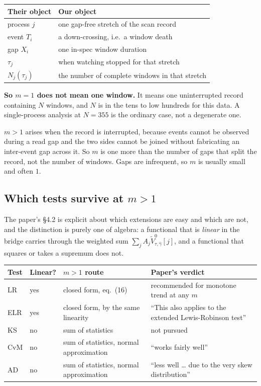 \documentclass[11pt,a4paper]{article}
\newcommand{\Vtilde}{\widetilde{V}^{0}_{\tau,\hat\gamma}}
\begin{document}
\begin{center}
\begin{tabular}{@{}ll@{}}
\toprule
\textbf{Their object} & \textbf{Our object}\\
\midrule
process $j$ & one gap-free stretch of the scan record\\
event $T_i$ & a down-crossing, i.e.\ a window death\\
gap $X_i$ & one in-spec window duration\\
$\tau_j$ & when watching stopped for that stretch\\
$N_j(\tau_j)$ & the number of complete windows in that stretch\\
\bottomrule
\end{tabular}
\end{center}

\medskip
\noindent
\textbf{So $m=1$ does not mean one window.} It means one uninterrupted record containing
$N$ windows, and $N$ is in the tens to low hundreds for this data. A single-process
analysis at $N=355$ is the ordinary case, not a degenerate one.

$m>1$ arises when the record is interrupted, because events cannot be observed during a
read gap and the two sides cannot be joined without fabricating an inter-event gap
across it. So $m$ is one more than the number of gaps that split the record, not the
number of windows. Gaps are infrequent, so $m$ is usually small and often $1$.

\subsection{Which tests survive at \texorpdfstring{$m>1$}{m>1}}
\label{sec:mgt1}

The paper's \S 4.2 is explicit about which extensions are easy and which are not, and the
distinction is purely one of algebra: a functional that is \emph{linear} in the bridge
carries through the weighted sum $\sum_j A_j \Vtilde[j]$, and a functional that squares
or takes a supremum does not.

\begin{center}
\small
\begin{tabular}{@{}p{}p{}p{}p{}@{}}
\toprule
\textbf{Test} & \textbf{Linear?} & \textbf{$m>1$ route} & \textbf{Paper's verdict}\\
\midrule
LR & yes & closed form, eq.~(16) & recommended for monotone trend at any $m$\\
ELR & yes & closed form, by the same linearity & \enquote{This also applies to the extended Lewis-Robinson test}\\
KS & no & sum of statistics & not pursued\\
CvM & no & sum of statistics, normal approximation & \enquote{works fairly well}\\
AD & no & sum of statistics, normal approximation & \enquote{less well \dots{} due to the very skew distribution}\\
\bottomrule
\end{tabular}
\end{center}
\end{document}
